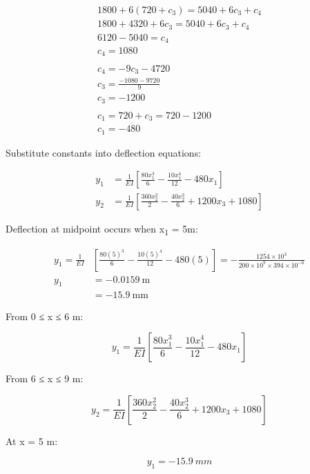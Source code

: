 \documentclass[
  letterpaper,
  DIV=11,
  numbers=noendperiod]{scrreprt}
\begin{document}
\begin{tcolorbox}
\begin{tcolorbox}
\[
\begin{gathered}
1800+6\left(720+c_3\right)=5040+6 c_3+c_4 \\
1800+4320+6 c_3=5040+6 c_3+c_4 \\
6120-5040=c_4 \\
c_4=1080 \\\\
c_4=-9 c_3-4720 \\
c_3=\frac{-1080-9720}{9} \\
c_3=-1200 \\\\
c_1=720+c_3=720-1200 \\
c_1=-480
\end{gathered}
\]

Substitute constants into deflection equations:

\[
\begin{aligned}y_1 & =\frac{1}{E I}\left[\frac{80 x_1^3}{6}-\frac{10 x_1^4}{12}-480 x_1\right] \\y_2 & =\frac{1}{E I}\left[\frac{360 x_2^2}{2}-\frac{40 x_2^3}{6}+1200 x_3+1080\right]\end{aligned}
\]

Deflection at midpoint occurs when x\textsubscript{1} = 5m:

\[
\begin{aligned}y_1=\frac{1}{EI} & {\left[\frac{80(5)^3}{6}-\frac{10(5)^4}{12}-480(5)\right]=-\frac{1254 \times 10^3}{200 \times 10^9 \times 394 \times 10^{-6}} } \\y_1 & =-0.0159 \mathrm{~m} \\& =-15.9 \mathrm{~mm}\end{aligned}
\]

\end{tcolorbox}

\begin{tcolorbox}[enhanced jigsaw, colbacktitle=quarto-callout-note-color!10!white, title={Answer only}, coltitle=black, leftrule=.75mm, rightrule=.15mm, opacityback=0, breakable, colframe=quarto-callout-note-color-frame, left=2mm, arc=.35mm, colback=white, bottomrule=.15mm, bottomtitle=1mm, toptitle=1mm, titlerule=0mm, opacitybacktitle=0.6, toprule=.15mm]

From 0 ≤ x ≤ 6 m:

\[
y_1=\frac{1}{E I}\left[\frac{80 x_1^3}{6}-\frac{10 x_1^4}{12}-480 x_1\right]
\]

From 6 ≤ x ≤ 9 m:

\[
y_2=\frac{1}{E I}\left[\frac{360 x_2^2}{2}-\frac{40 x_2^3}{6}+1200 x_3+1080\right]
\]

At x = 5 m:

\[
y_1=-15.9~mm
\]

\end{tcolorbox}

\end{tcolorbox}
\end{document}
